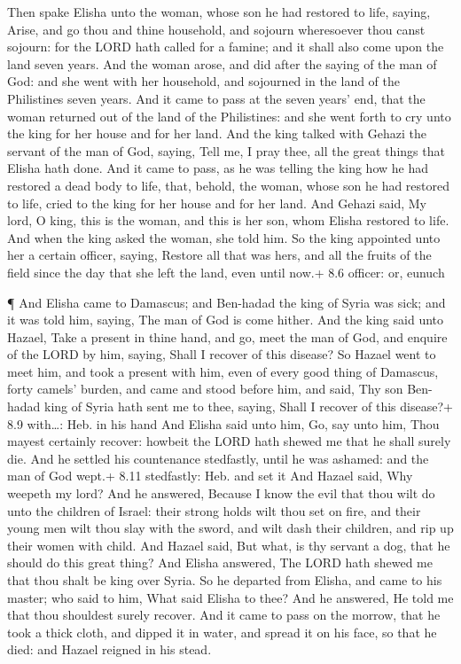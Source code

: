  Then spake Elisha unto the woman, whose son he had restored
to life, saying, Arise, and go thou and thine household, and sojourn
wheresoever thou canst sojourn: for the LORD hath called for a famine;
and it shall also come upon the land seven years.  And the
woman arose, and did after the saying of the man of God: and she went
with her household, and sojourned in the land of the Philistines seven
years.  And it came to pass at the seven years' end, that
the woman returned out of the land of the Philistines: and she went
forth to cry unto the king for her house and for her land. 
And the king talked with Gehazi the servant of the man of God, saying,
Tell me, I pray thee, all the great things that Elisha hath done.
 And it came to pass, as he was telling the king how he had
restored a dead body to life, that, behold, the woman, whose son he had
restored to life, cried to the king for her house and for her land. And
Gehazi said, My lord, O king, this is the woman, and this is her son,
whom Elisha restored to life.  And when the king asked the
woman, she told him. So the king appointed unto her a certain officer,
saying, Restore all that was hers, and all the fruits of the field since
the day that she left the land, even until now.+ 8.6 officer: or, eunuch

 ¶ And Elisha came to Damascus; and Ben-hadad the king of
Syria was sick; and it was told him, saying, The man of God is come
hither.  And the king said unto Hazael, Take a present in
thine hand, and go, meet the man of God, and enquire of the LORD by him,
saying, Shall I recover of this disease?  So Hazael went to
meet him, and took a present with him, even of every good thing of
Damascus, forty camels' burden, and came and stood before him, and said,
Thy son Ben-hadad king of Syria hath sent me to thee, saying, Shall I
recover of this disease?+ 8.9 with\ldots: Heb. in his hand 
And Elisha said unto him, Go, say unto him, Thou mayest certainly
recover: howbeit the LORD hath shewed me that he shall surely die.
 And he settled his countenance stedfastly, until he was
ashamed: and the man of God wept.+ 8.11 stedfastly: Heb. and set it
 And Hazael said, Why weepeth my lord? And he answered,
Because I know the evil that thou wilt do unto the children of Israel:
their strong holds wilt thou set on fire, and their young men wilt thou
slay with the sword, and wilt dash their children, and rip up their
women with child.  And Hazael said, But what, is thy
servant a dog, that he should do this great thing? And Elisha answered,
The LORD hath shewed me that thou shalt be king over Syria.
 So he departed from Elisha, and came to his master; who
said to him, What said Elisha to thee? And he answered, He told me that
thou shouldest surely recover.  And it came to pass on the
morrow, that he took a thick cloth, and dipped it in water, and spread
it on his face, so that he died: and Hazael reigned in his stead.


